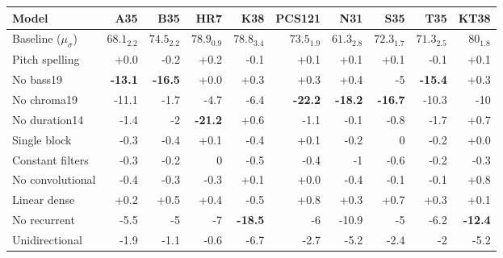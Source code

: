 \begin{tabular}{l|rrrrrrrrr}
Model               & A35            & B35            & HR7            & K38            & PCS121         & N31            & S35            & T35            & KT38           \\ \hline
Baseline ($\mu_\sigma$)     & $68.1_{2.2}$          & $74.5_{2.2}$           & $78.9_{0.9}$           & $78.8_{3.4}$           & $73.5_{1.9}$           & $61.3_{2.8}$           & $72.3_{1.7}$           & $71.3_{2.5}$           & $80_{1.8}$             \\ \hline
Pitch spelling      & +0.0           & -0.2           & +0.2           & -0.1           & +0.1           & +0.1           & +0.1           & -0.1           & +0.1           \\
No \gls{bass19}   & \textbf{-13.1} & \textbf{-16.5} & +0.0           & +0.3           & +0.3           & +0.4           & -5             & \textbf{-15.4} & +0.3           \\
No \gls{chroma19} & -11.1          & -1.7           & -4.7           & -6.4           & \textbf{-22.2} & \textbf{-18.2} & \textbf{-16.7} & -10.3          & -10            \\
No \gls{duration14}     & -1.4           & -2             & \textbf{-21.2} & +0.6           & -1.1           & -0.1           & -0.8           & -1.7           & +0.7           \\
Single block        & -0.3           & -0.4           & +0.1           & -0.4           & +0.1           & -0.2           & 0              & -0.2           & +0.0           \\
Constant filters    & -0.3           & -0.2           & 0              & -0.5           & -0.4           & -1             & -0.6           & -0.2           & -0.3           \\
No convolutional    & -0.4           & -0.3           & -0.3           & +0.1           & +0.0           & -0.4           & -0.1           & -0.1           & +0.8           \\
Linear dense        & +0.2           & +0.5           & +0.4           & -0.5           & +0.8           & +0.3           & +0.7           & +0.3           & +0.1           \\
No recurrent        & -5.5           & -5             & -7             & \textbf{-18.5} & -6             & -10.9          & -5             & -6.2           & \textbf{-12.4} \\
Unidirectional      & -1.9           & -1.1           & -0.6           & -6.7           & -2.7           & -5.2           & -2.4           & -2             & -5.2          
\end{tabular}
